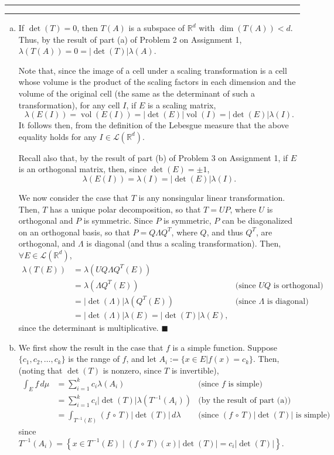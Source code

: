\documentclass[11pt]{article}
\newcounter{questionCounter}
\newcounter{partCounter}[questionCounter]
\newenvironment{question}[2][\arabic{questionCounter}]{%
    \setcounter{partCounter}{0}%
    \vspace{.25in} \hrule \vspace{0.5em}%
        \noindent{\bf #2}%
    \vspace{0.8em} \hrule \vspace{.10in}%
    \addtocounter{questionCounter}{1}%
}{}
\renewcommand{\qed}{\quad $\blacksquare$}
\newcommand{\inv}{^{-1}}
\newcommand{\vol}{\operatorname{vol}}
\newcommand{\R}{\mathbb{R}} %
\newcommand{\LR}[1]{\mathcal{L}\left(\R^{#1}\right)} %
\begin{document}
\begin{question}{Problem 5}
\begin{enumerate}[(a)]
\item If $\det(T) = 0$, then $T(A)$ is a subspace of $\R^d$ with
$\dim(T(A)) < d$. Thus, by the result of part (a) of Problem 2 on Assignment
1, $\lambda(T(A)) = 0 = |\det(T)| \lambda(A)$.

Note that, since the image of a cell under a scaling transformation is a cell
whose volume is the product of the scaling factors in each dimension and the
volume of the original cell (the same as the determinant of such a
transformation), for any cell $I$, if $E$ is a scaling matrix,
\[\lambda(E(I)) = \vol(E(I)) = |\det(E)|\vol(I) = |\det(E)|\lambda(I).\]
It follows then, from the definition of the Lebesgue measure that the above
equality holds for any $I \in \LR{d}$.

Recall also that, by the result of part (b) of Problem 3 on Assignment 1,
if $E$ is an orthogonal matrix, then, since $\det(E) = \pm 1$,
\[\lambda(E(I)) = \lambda(I) = |\det(E)|\lambda(I).\]

We now consider the case that $T$ is any nonsingular linear transformation.
Then, $T$ has a unique polar decomposition, so that $T = UP$, where $U$ is
orthogonal and $P$ is symmetric. Since $P$ is symmetric, $P$ can be
diagonalized on an orthogonal basis, so that $P = Q\Lambda Q^T$, where $Q$,
and thus $Q^T$, are orthogonal, and $\Lambda$ is diagonal (and thus a scaling
transformation). Then, $\forall E \in \LR{d}$,
\begin{align*}
\lambda(T(E))
 & = \lambda(UQ\Lambda Q^T(E))                                              \\
 & = \lambda(\Lambda Q^T(E))          & \mbox{(since $UQ$ is orthogonal)}   \\
 & = |\det(\Lambda)|\lambda(Q^T(E))   & \mbox{(since $\Lambda$ is diagonal)} \\
 & = |\det(\Lambda)|\lambda(E)        
   = |\det(T)|\lambda(E),
\end{align*}
since the determinant is multiplicative. \qed

\item We first show the result in the case that $f$ is a simple function.
Suppose $\{c_1,c_2,\ldots,c_k\}$ is the range of $f$, and let
$A_i := \{x \in E | f(x) = c_k\}$. Then, (noting that
$\det(T)$ is nonzero, since $T$ is invertible),
\begin{align*}
\int_{E} f \, d\mu
 & = \sum_{i = 1}^k c_i \lambda(A_i) & \mbox{(since $f$ is simple)} \\
 & = \sum_{i = 1}^k c_i |\det(T)| \lambda(T\inv(A_i)) & \mbox{(by the result of part (a))} \\
 & = \int_{T\inv(E)} (f \, \circ \, T)|\det(T)| \, d\lambda & \mbox{(since $(f \, \circ \, T) |\det(T)|$ is simple)}
\end{align*}
since $T\inv(A_i) = \left\{ x \in T\inv(E) \; | \; (f \, \circ \, T)(x) |\det(T)| = c_i|\det(T)| \right\}$.


\end{enumerate}
\end{question}
\end{document}
